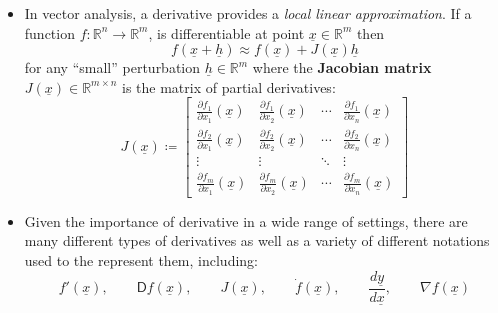 \documentclass[11pt,twoside]{report}
\newcommand{\bbR}{{\mathbb{R}}}
\newcommand{\vecnot}{\underline}
\begin{document}
\begin{itemize}

\item In vector analysis,  a derivative provides a  \emph{local linear approximation}.  If a function  $f\colon \bbR^n \to \bbR^m$, is differentiable at point $\vecnot{x} \in \bbR^m$ then %
 \[
 f(\vecnot{x} + \vecnot{h})  \approx  f(\vecnot{x}) + J(\vecnot{x}) \vecnot{h} %
 \]
 for any ``small''  perturbation $\vecnot{h} \in \bbR^m$  where
 the  \textbf{Jacobian matrix} $J(\vecnot{x})\in \bbR^{m\times n}$ is the matrix of partial derivatives:
\[
J(\vecnot{x}) \coloneqq %
\begin{bmatrix} \frac{\partial  f_1}{\partial  x_1} (\vecnot{x}) & \frac{\partial  f_1}{\partial  x_2} (\vecnot{x}) & \cdots & \frac{\partial  f_1}{\partial  x_n} (\vecnot{x}) \\
\frac{\partial  f_2}{\partial  x_1} (\vecnot{x}) & \frac{\partial  f_2}{\partial  x_2} (\vecnot{x}) & \cdots & \frac{\partial  f_2}{\partial  x_n} (\vecnot{x}) \\
\vdots & \vdots & \ddots & \vdots \\
\frac{\partial  f_m}{\partial  x_1} (\vecnot{x}) & \frac{\partial  f_m}{\partial  x_2} (\vecnot{x}) & \cdots & \frac{\partial  f_m}{\partial  x_n} (\vecnot{x}) \end{bmatrix} 
\]

\item Given the importance of derivative in a wide range of settings, there are many different types of derivatives as well as a variety of different notations used to the represent them, including:
\[
f'(\vecnot{x}),  \qquad \mathsf{D} f(\vecnot{x}) , \qquad J(\vecnot{x}), \qquad \dot{f}(\vecnot{x}) , \qquad  \frac{ d \vecnot{y}}{ d \vecnot{x}}, \qquad \nabla f(\vecnot{x}) 
\]



\end{itemize}
\end{document}
